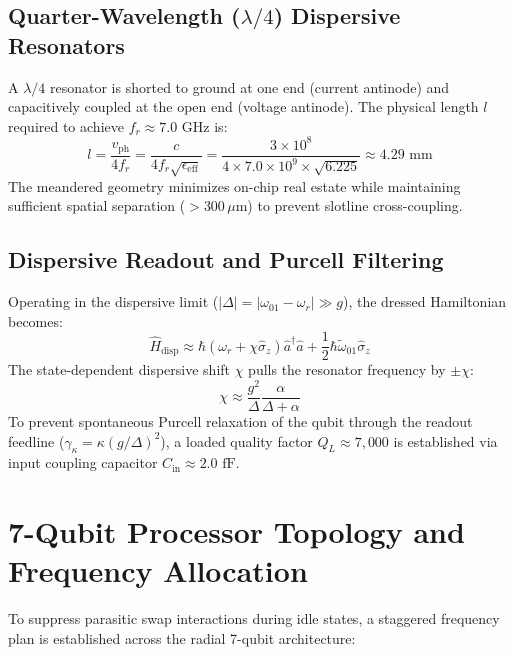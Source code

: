 \documentclass[10pt,journal,compsoc]{IEEEtran}
\begin{document}
\subsection{Quarter-Wavelength ($\lambda/4$) Dispersive Resonators}
A $\lambda/4$ resonator is shorted to ground at one end (current antinode) and capacitively coupled at the open end (voltage antinode). The physical length $l$ required to achieve $f_r \approx 7.0\text{ GHz}$ is:
\begin{equation}
l = \frac{v_{\text{ph}}}{4 f_r} = \frac{c}{4 f_r \sqrt{\epsilon_{\text{eff}}}} = \frac{3 \times 10^8}{4 \times 7.0\times 10^9 \times \sqrt{6.225}} \approx 4.29\text{ mm}
\end{equation}
The meandered geometry minimizes on-chip real estate while maintaining sufficient spatial separation ($> 300\,\mu\text{m}$) to prevent slotline cross-coupling.

\subsection{Dispersive Readout and Purcell Filtering}
Operating in the dispersive limit ($|\Delta| = |\omega_{01} - \omega_r| \gg g$), the dressed Hamiltonian becomes:
\begin{equation}
\hat{H}_{\text{disp}} \approx \hbar \left(\omega_r + \chi \hat{\sigma}_z\right) \hat{a}^\dagger \hat{a} + \frac{1}{2} \hbar \tilde{\omega}_{01} \hat{\sigma}_z
\end{equation}
The state-dependent dispersive shift $\chi$ pulls the resonator frequency by $\pm \chi$:
\begin{equation}
\chi \approx \frac{g^2}{\Delta} \frac{\alpha}{\Delta + \alpha}
\end{equation}
To prevent spontaneous Purcell relaxation of the qubit through the readout feedline ($\gamma_\kappa = \kappa (g/\Delta)^2$), a loaded quality factor $Q_L \approx 7,000$ is established via input coupling capacitor $C_{\text{in}} \approx 2.0\text{ fF}$.

\section{7-Qubit Processor Topology and Frequency Allocation}
To suppress parasitic swap interactions during idle states, a staggered frequency plan is established across the radial 7-qubit architecture:
\end{document}
